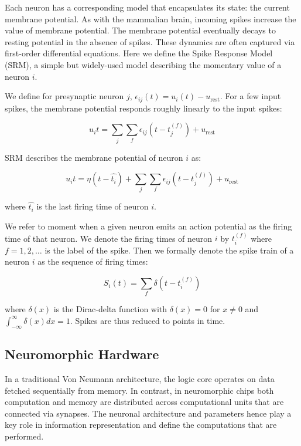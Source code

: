 \documentclass[fyp]{socreport}
\begin{document}
Each neuron has a corresponding model that encapsulates its state: the current
membrane potential. As with the mammalian brain, incoming spikes increase the
value of membrane potential. The membrane potential eventually decays to resting
potential in the absence of spikes. These dynamics are often captured via
first-order differential equations. Here we define the Spike Response Model
(SRM), a simple but widely-used model describing the momentary value of a neuron
\(i\).

We define for presynaptic neuron \(j\),
\(\epsilon_{ij}(t) = u_{i}(t) - u_{\text{rest}}\). For a few input spikes, the
membrane potential responds roughly linearly to the input spikes:

\begin{equation} u_i{t} = \sum_{j}\sum_{f} \epsilon_{ij}(t - t_j^{(f)}) + u_{\text{rest}}
\end{equation}

SRM describes the membrane potential of neuron \(i\) as:

\begin{equation} u_i{t} = \eta (t - \hat{t_i}) + \sum_{j}\sum_{f} \epsilon_{ij}(t - t_j^{(f)}) + u_{\text{rest}}
\end{equation}

where \(\hat{t_i}\) is the last firing time of neuron \(i\).

We refer to moment when a given neuron emits an action potential as the firing
time of that neuron. We denote the firing times of neuron \(i\) by \(t_i^{(f)}\)
where \(f = 1,2,\dots\) is the label of the spike.  Then we formally denote the
spike train of a neuron \(i\) as the sequence of firing times:

\begin{equation} S_i(t) = \sum_{f} \delta\left( t - t_i^{(f)} \right)
\end{equation}

where \(\delta(x)\) is the Dirac-delta function with \(\delta(x) = 0\) for
\(x \ne 0\) and \(\int_{-\infty}^{\infty} \delta(x)dx = 1\). Spikes are thus
reduced to points in time.


\subsection{Neuromorphic Hardware\label{neuromorphic}}

In a traditional Von Neumann architecture, the logic core operates on data
fetched sequentially from memory. In contrast, in neuromorphic chips both
computation and memory are distributed across computational units that are
connected via synapses. The neuronal architecture and parameters hence play a
key role in information representation and define the computations that are
performed.
\end{document}
